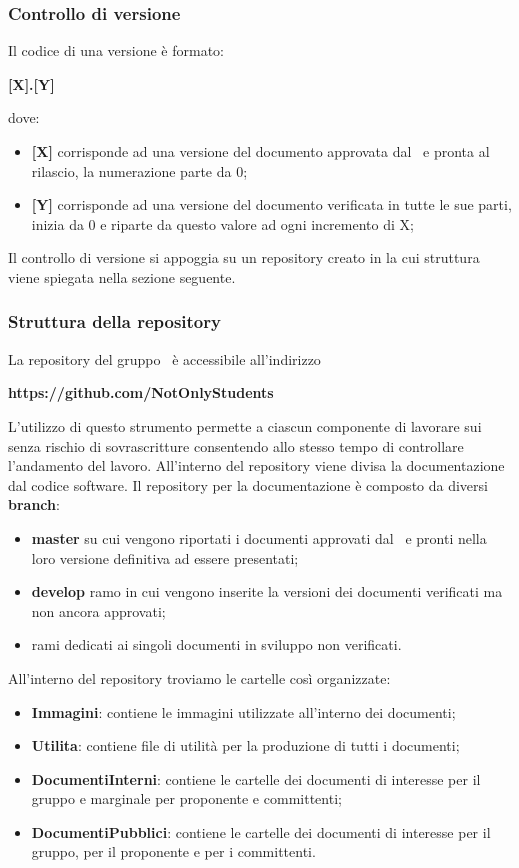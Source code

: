 \subsubsection{Controllo di versione}\label{Versionamento}
Il codice di una versione è formato: 
\begin{center}
	\textbf{[X].[Y]}
\end{center}
dove:
\begin{itemize}
	\item \textbf{[X]} corrisponde ad una versione del documento approvata dal \Responsabile\ e pronta al rilascio, la numerazione parte da 0;
	\item \textbf{[Y]} corrisponde ad una versione del documento verificata in tutte le sue parti, inizia da 0 e riparte da questo valore ad ogni incremento di X;
\end{itemize}
Il controllo di versione si appoggia su un repository creato in  la cui struttura viene spiegata nella sezione seguente.

\subsubsection{Struttura della repository}\label{StrutturaRepo}
La repository del gruppo \Gruppo\ è accessibile all'indirizzo
\begin{center}
	\textbf{https://github.com/NotOnlyStudents}
\end{center}
L'utilizzo di questo strumento permette a ciascun componente di lavorare sui  senza rischio di sovrascritture consentendo allo stesso tempo di controllare l'andamento del lavoro. 
All'interno del repository viene divisa la documentazione dal codice software.
\label{RepoDoc}Il repository per la documentazione è composto da diversi \textbf{branch}:
\begin{itemize}
	\item \textbf{master} su cui vengono riportati i documenti approvati dal \Responsabile\ e pronti nella loro versione definitiva ad essere presentati;
	\item \textbf{develop} ramo in cui vengono inserite la versioni dei documenti verificati ma non ancora approvati;
	\item rami dedicati ai singoli documenti in sviluppo non verificati.
\end{itemize}
All'interno del repository troviamo le cartelle così organizzate:
\begin{itemize}
	\item \textbf{Immagini}: contiene le immagini utilizzate all'interno dei documenti;
	\item \textbf{Utilita}: contiene file di utilità per la produzione di tutti i documenti;
	\item \textbf{DocumentiInterni}: contiene le cartelle dei documenti di interesse per il gruppo e marginale per proponente e committenti;
	\item \textbf{DocumentiPubblici}: contiene le cartelle dei documenti di interesse per il gruppo, per il proponente e per i committenti.
\end{itemize}

